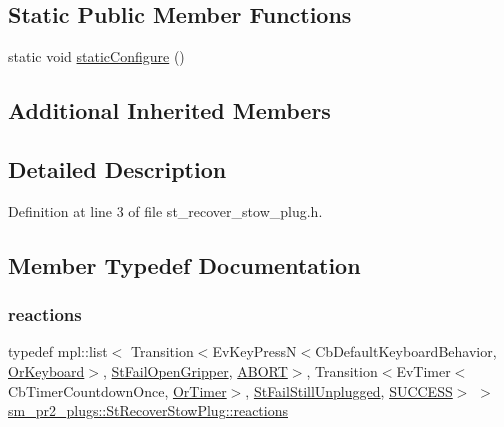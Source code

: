 \subsection*{Static Public Member Functions}
\begin{DoxyCompactItemize}
\item 
static void \hyperlink{structsm__pr2__plugs_1_1StRecoverStowPlug_a8ac2f706967a6f32561d26dfa894ce04}{static\+Configure} ()
\end{DoxyCompactItemize}
\subsection*{Additional Inherited Members}


\subsection{Detailed Description}


Definition at line 3 of file st\+\_\+recover\+\_\+stow\+\_\+plug.\+h.



\subsection{Member Typedef Documentation}
\mbox{\label{structsm__pr2__plugs_1_1StRecoverStowPlug_a44331b5028d908b5a20054cc2ddb1972}} 
\subsubsection{\texorpdfstring{reactions}{reactions}}
{\footnotesize\ttfamily typedef mpl\+::list$<$ Transition$<$Ev\+Key\+PressN$<$Cb\+Default\+Keyboard\+Behavior, \hyperlink{classsm__pr2__plugs_1_1OrKeyboard}{Or\+Keyboard}$>$, \hyperlink{structsm__pr2__plugs_1_1StFailOpenGripper}{St\+Fail\+Open\+Gripper}, \hyperlink{classABORT}{A\+B\+O\+RT}$>$, Transition$<$Ev\+Timer$<$Cb\+Timer\+Countdown\+Once, \hyperlink{classsm__pr2__plugs_1_1OrTimer}{Or\+Timer}$>$, \hyperlink{structsm__pr2__plugs_1_1StFailStillUnplugged}{St\+Fail\+Still\+Unplugged}, \hyperlink{classSUCCESS}{S\+U\+C\+C\+E\+SS}$>$ $>$ \hyperlink{structsm__pr2__plugs_1_1StRecoverStowPlug_a44331b5028d908b5a20054cc2ddb1972}{sm\+\_\+pr2\+\_\+plugs\+::\+St\+Recover\+Stow\+Plug\+::reactions}}



